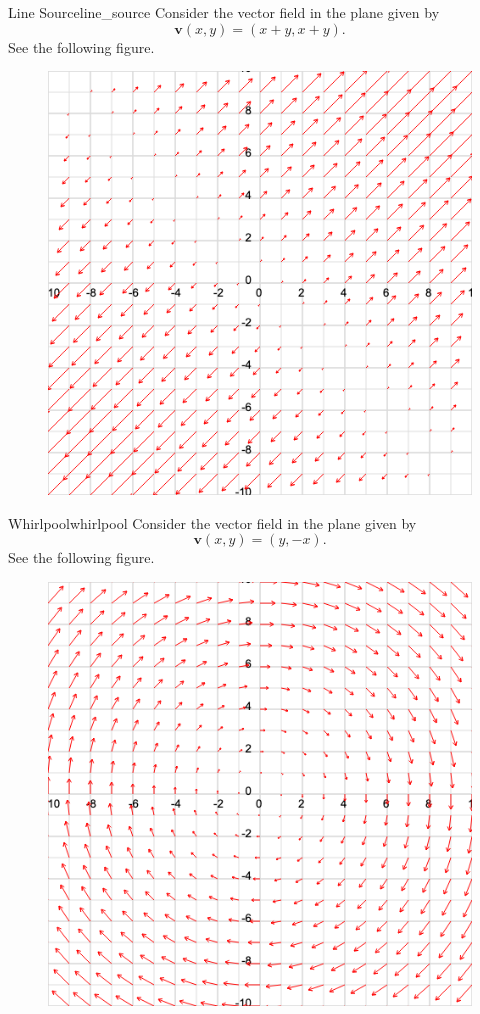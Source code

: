         \begin{ex}{Line Source}{line_source}
        Consider the vector field in the plane given by
        \[
        \mathbf{v}(x,y)=(x+y,x+y).
        \]
        See the following figure.
        \begin{figure}[H]
            \centering
            \includegraphics[width=.6\textwidth]{Figures/v_field_1.png}
        \end{figure}
        \end{ex}
        
        \begin{ex}{Whirlpool}{whirlpool}
        Consider the vector field in the plane given by
        \[
        \mathbf{v}(x,y)=(y,-x).
        \]
        See the following figure.
        \begin{figure}[H]
            \centering
            \includegraphics[width=.6\textwidth]{Figures/v_field_3.png}
        \end{figure}
        \end{ex}
        
